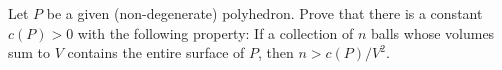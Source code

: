Let $P$ be a given (non-degenerate) polyhedron. Prove that there is a constant $c(P) > 0$
with the following property: If a collection of $n$ balls whose volumes sum to $V$ contains
the entire surface of $P$, then $n > c(P) / V^2$.
